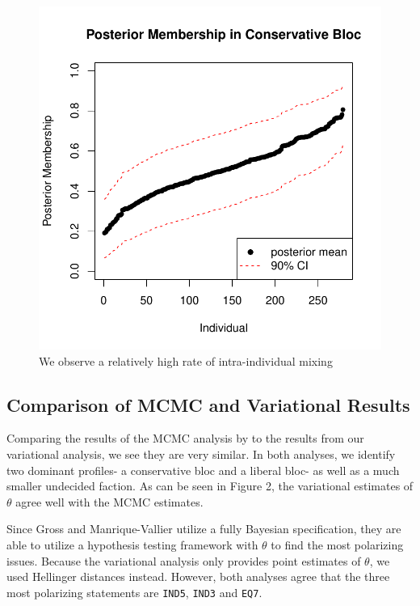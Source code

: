 \documentclass{article}\usepackage[]{graphicx}\usepackage[]{color}
\makeatletter
\def\maxwidth{ %
  \ifdim\Gin@nat@width>\linewidth
    \linewidth
  \else
    \Gin@nat@width
  \fi
}
\newenvironment{knitrout}{}{} %
\renewenvironment{knitrout}{\begin{singlespace}}{\end{singlespace}}
\makeatother
\begin{document}
\begin{knitrout}
\begin{figure}
{\centering \includegraphics[width=\maxwidth]{figure/posteriorMem-1} 

}

\caption[We observe a relatively high rate of intra-individual mixing]{We observe a relatively high rate of intra-individual mixing\label{fig:posteriorMem}}
\end{figure}


\end{knitrout}


\subsection{Comparison of MCMC and Variational Results}
Comparing the results of the MCMC analysis by \cite{grossManriqueVallier} to the results from our variational analysis, we see they are very similar. In both analyses, we identify two dominant profiles- a conservative bloc and a liberal bloc- as well as a much smaller undecided faction. As can be seen in Figure 2, the variational estimates of $\theta$ agree well with the MCMC estimates.

Since Gross and Manrique-Vallier utilize a fully Bayesian specification, they  are able to utilize a hypothesis testing framework with $\theta$ to find the most polarizing issues. Because the variational analysis only provides point estimates of $\theta$, we used Hellinger distances instead. However, both analyses agree that the three most polarizing statements are  \texttt{IND5}, \texttt{IND3} and \texttt{EQ7}.
\end{document}
